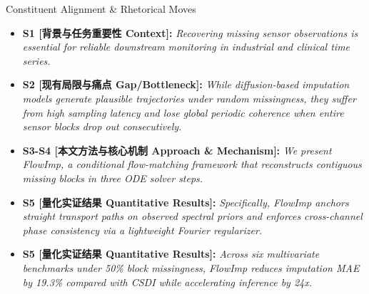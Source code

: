 \begin{TipBox}{Constituent Alignment \& Rhetorical Moves}
\begin{itemize}[leftmargin=1.5em]
  \item \textbf{S1 [背景与任务重要性 Context]:} \textit{Recovering missing sensor observations is essential for reliable downstream monitoring in industrial and clinical time series.}\par{}
  \item \textbf{S2 [现有局限与痛点 Gap/Bottleneck]:} \textit{While diffusion-based imputation models generate plausible trajectories under random missingness, they suffer from high sampling latency and lose global periodic coherence when entire sensor blocks drop out consecutively.}\par{}
  \item \textbf{S3-S4 [本文方法与核心机制 Approach \& Mechanism]:} \textit{We present FlowImp, a conditional flow-matching framework that reconstructs contiguous missing blocks in three ODE solver steps.}\par{}
  \item \textbf{S5 [量化实证结果 Quantitative Results]:} \textit{Specifically, FlowImp anchors straight transport paths on observed spectral priors and enforces cross-channel phase consistency via a lightweight Fourier regularizer.}\par{}
  \item \textbf{S5 [量化实证结果 Quantitative Results]:} \textit{Across six multivariate benchmarks under 50\% block missingness, FlowImp reduces imputation MAE by 19.3\% compared with CSDI while accelerating inference by 24x.}\par{}
\end{itemize}
\end{TipBox}
\bigskip
